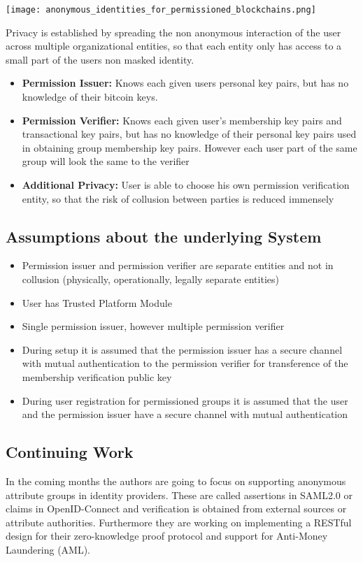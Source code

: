 \texttt{[image: anonymous\_identities\_for\_permissioned\_blockchains.png]}

Privacy is established by spreading the non anonymous interaction of the user across multiple organizational entities, so that each entity only has access to a small part of the users non masked identity.
\begin{itemize}
\item \textbf{Permission Issuer:}
Knows each given users personal key pairs, but has no knowledge of their bitcoin keys.
\item \textbf{Permission Verifier:}
Knows each given user's membership key pairs and transactional key pairs, but has no knowledge of their personal key pairs used in obtaining group membership key pairs. However each user part of the same group will look the same to the verifier
\item \textbf{Additional Privacy:}
User is able to choose his own permission verification entity, so that the risk of collusion between parties is reduced immensely
\end{itemize}

\subsection{Assumptions about the underlying System}
\begin{itemize}
\item Permission issuer and permission verifier are separate entities and not in collusion (physically, operationally, legally separate entities)
\item User has Trusted Platform Module
\item Single permission issuer, however multiple permission verifier
\item During setup it is assumed that the permission issuer has a secure channel with mutual authentication to the permission verifier for transference of the membership verification public key
\item During user registration for permissioned groups it is assumed that the user and the permission issuer have a secure channel with mutual authentication
\end{itemize}
\subsection{Continuing Work}
In the coming months the authors are going to focus on supporting anonymous attribute groups in identity providers. These are called assertions in SAML2.0 or claims in OpenID-Connect and verification is obtained from external sources or attribute authorities. Furthermore they are working on implementing a RESTful design for their zero-knowledge proof protocol and support for Anti-Money Laundering (AML).


